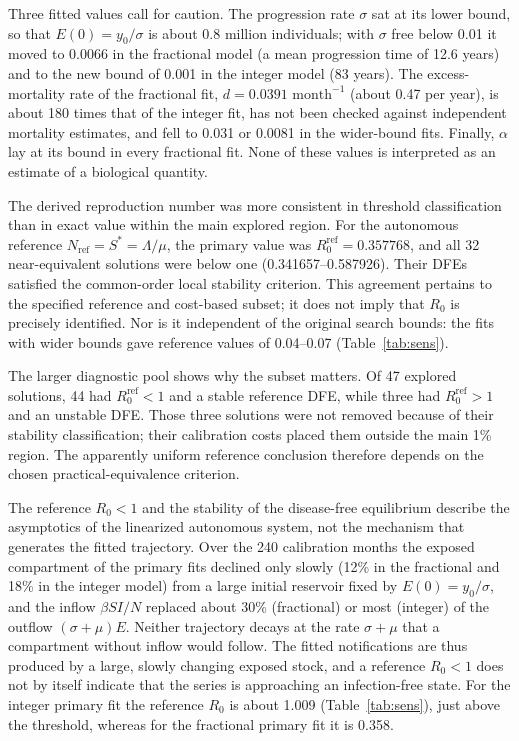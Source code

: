 \documentclass[pdflatex,sn-mathphys-ay,lineno]{sn-jnl}
\begin{document}
Three fitted values call for caution. The progression rate $\sigma$ sat at its lower bound, so that $E(0)=y_0/\sigma$ is about 0.8 million individuals; with $\sigma$ free below 0.01 it moved to 0.0066 in the fractional model (a mean progression time of 12.6 years) and to the new bound of 0.001 in the integer model (83 years). The excess-mortality rate of the fractional fit, $d=0.0391\text{ month}^{-1}$ (about 0.47 per year), is about 180 times that of the integer fit, has not been checked against independent mortality estimates, and fell to 0.031 or 0.0081 in the wider-bound fits. Finally, $\alpha$ lay at its bound in every fractional fit. None of these values is interpreted as an estimate of a biological quantity.

The derived reproduction number was more consistent in threshold classification than in exact value within the main explored region. For the autonomous reference $N_{\mathrm{ref}}=S^*=\Lambda/\mu$, the primary value was $R_0^{\mathrm{ref}}=0.357768$, and all 32 near-equivalent solutions were below one (0.341657--0.587926). Their DFEs satisfied the common-order local stability criterion. This agreement pertains to the specified reference and cost-based subset; it does not imply that $R_0$ is precisely identified. Nor is it independent of the original search bounds: the fits with wider bounds gave reference values of 0.04--0.07 (Table~\ref{tab:sens}).

The larger diagnostic pool shows why the subset matters. Of 47 explored solutions, 44 had $R_0^{\mathrm{ref}}<1$ and a stable reference DFE, while three had $R_0^{\mathrm{ref}}>1$ and an unstable DFE. Those three solutions were not removed because of their stability classification; their calibration costs placed them outside the main 1\% region. The apparently uniform reference conclusion therefore depends on the chosen practical-equivalence criterion.

The reference $R_0<1$ and the stability of the disease-free equilibrium describe the asymptotics of the linearized autonomous system, not the mechanism that generates the fitted trajectory. Over the 240 calibration months the exposed compartment of the primary fits declined only slowly (12\% in the fractional and 18\% in the integer model) from a large initial reservoir fixed by $E(0)=y_0/\sigma$, and the inflow $\beta SI/N$ replaced about 30\% (fractional) or most (integer) of the outflow $(\sigma+\mu)E$. Neither trajectory decays at the rate $\sigma+\mu$ that a compartment without inflow would follow. The fitted notifications are thus produced by a large, slowly changing exposed stock, and a reference $R_0<1$ does not by itself indicate that the series is approaching an infection-free state. For the integer primary fit the reference $R_0$ is about 1.009 (Table~\ref{tab:sens}), just above the threshold, whereas for the fractional primary fit it is 0.358.
\end{document}
